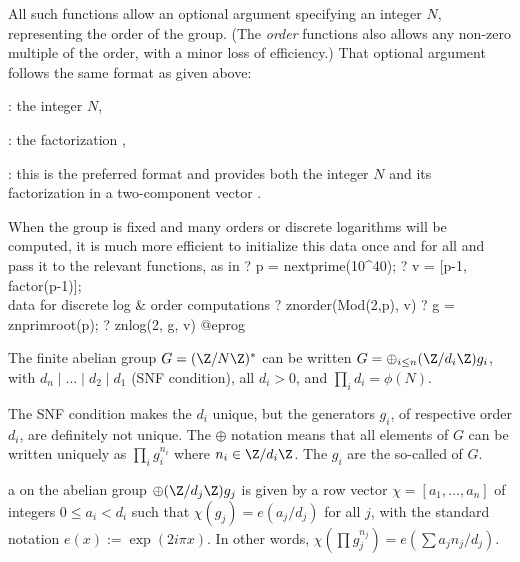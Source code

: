 All such functions allow an optional argument specifying an integer
$N$, representing the order of the group. (The \emph{order} functions also
allows any non-zero multiple of the order, with a minor loss of efficiency.)
That optional argument follows the same format as given above:

\item {}: the integer $N$,

\item {}: the factorization ,

\item {}: this is the preferred format and provides both the
integer $N$ and its factorization in a two-component vector
\kbd{[$N$, fa]}.

When the group is fixed and many orders or discrete logarithms will be
computed, it is much more efficient to initialize this data once and for all
and pass it to the relevant functions, as in
\bprog
? p = nextprime(10^40);
? v = [p-1, factor(p-1)]; \\ data for discrete log & order computations
? znorder(Mod(2,p), v)
? g = znprimroot(p);
? znlog(2, g, v)
@eprog

\label{se:dirichletchar}

The finite abelian group $G = (\Z/N\Z)^*$ can be written $G = \oplus_{i\leq
n} (\Z/d_i\Z) g_i$, with $d_n \mid \dots \mid d_2 \mid d_1$ (SNF condition),
all $d_i > 0$, and $\prod_i d_i = \phi(N)$.

The SNF condition makes the $d_i$ unique, but the generators $g_i$, of
respective order $d_i$, are definitely not unique. The $\oplus$ notation
means that all elements of $G$ can be written uniquely as $\prod_i g_i^{n_i}$
where $n_i \in \Z/d_i\Z$. The $g_i$ are the so-called 
of $G$.

\item a  on the abelian group
$\oplus (\Z/d_j\Z) g_j$
is given by a row vector $\chi = [a_1,\ldots,a_n]$ of integers $0\leq a_i  <
d_i$ such that $\chi(g_j) = e(a_j / d_j)$ for all $j$, with the standard
notation $e(x) := \exp(2i\pi x)$.
In other words,
$\chi(\prod g_j^{n_j}) = e(\sum a_j n_j / d_j)$.

